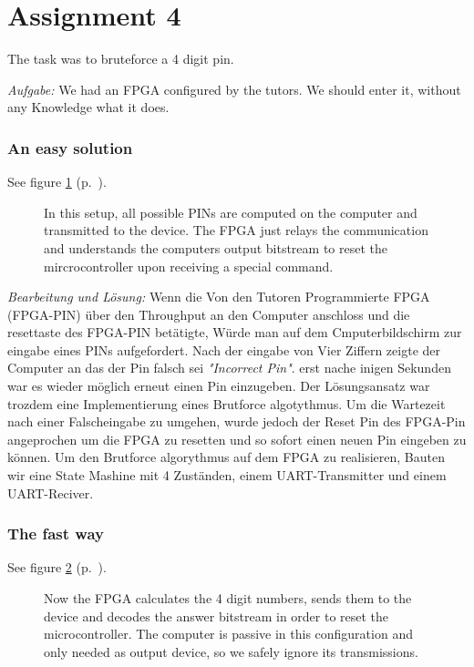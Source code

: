 \section*{Assignment 4}
The task was to bruteforce a 4 digit pin.

\emph{Aufgabe: }We had an FPGA configured by the tutors. We should enter it, without any Knowledge what it does.

\subsubsection*{An easy solution}
See figure \ref{as4-schematic-1} (p.~\pageref{as4-schematic-1}).

\begin{figure}[htb]
    \begin{center}
        
        \caption{In this setup, all possible PINs are computed on the computer and transmitted to the device. The FPGA just relays the communication and understands the computers output bitstream to reset the mircrocontroller upon receiving a special command.}
        \label{as4-schematic-1}
    \end{center}
\end{figure}

\emph{Bearbeitung und Lösung: }Wenn die Von den Tutoren Programmierte FPGA (FPGA-PIN) über den Throughput an den Computer anschloss und die resettaste des FPGA-PIN betätigte, Würde man auf dem Cmputerbildschirm zur eingabe eines PINs aufgefordert. Nach der eingabe von Vier Ziffern zeigte der Computer an das der Pin falsch sei \emph{"Incorrect Pin"}. erst nache inigen Sekunden war es wieder möglich erneut einen Pin einzugeben. 
Der Lösungsansatz war trozdem eine Implementierung eines Brutforce algotythmus. Um die Wartezeit nach einer Falscheingabe zu umgehen, wurde jedoch der Reset Pin des FPGA-Pin angeprochen um die FPGA zu resetten und so sofort einen neuen Pin eingeben zu können. 
Um den Brutforce algorythmus auf dem FPGA zu realisieren, Bauten wir eine State Mashine mit 4 Zuständen, einem UART-Transmitter und einem UART-Reciver.

\subsubsection*{The fast way}
See figure \ref{as4-schematic-2} (p.~\pageref{as4-schematic-2}).

\begin{figure}[htb]
    \begin{center}
        
        \caption{Now the FPGA calculates the 4 digit numbers, sends them to the device and decodes the answer bitstream in order to reset the microcontroller. The computer is passive in this configuration and only needed as output device, so we safely ignore its transmissions.}
        \label{as4-schematic-2}
    \end{center}
\end{figure}


